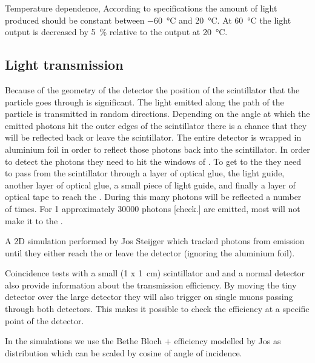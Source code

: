 Temperature dependence, According to specifications the amount of light
produced should be constant between \SI{-60}{\degreeCelsius} and
\SI{20}{\degreeCelsius}. At \SI{60}{\degreeCelsius} the light output is
decreased by \SI{5}{\percent} relative to the output at
\SI{20}{\degreeCelsius}.

\subsection{Light transmission}

Because of the geometry of the detector the position of the scintillator
that the particle goes through is significant. The light emitted along
the path of the particle is transmitted in random directions. Depending
on the angle at which the emitted photons hit the outer edges of the
scintillator there is a chance that they will be reflected back or leave
the scintillator. The entire detector is wrapped in aluminium foil in
order to reflect those photons back into the scintillator. In order to
detect the photons they need to hit the windows of \pmt. To get to the
\pmt they need to pass from the scintillator through a layer of optical
glue, the light guide, another layer of optical glue, a small piece of
light guide, and finally a layer of optical tape to reach the \pmt.
During this many photons will be reflected a number of times. For
\SI{1}{\mip} approximately 30000 photons [check.] are emitted, most will
not make it to the \pmt.

A 2D simulation performed by Jos Steijger which tracked photons from
emission until they either reach the \pmt or leave the detector
(ignoring the aluminium foil).

Coincidence tests with a small (\SI[product-units = repeat]{1 x
1}{\centi\meter}) scintillator and \pmt and a normal \hisparc detector
also provide information about the transmission efficiency. By moving
the tiny detector over the large detector they will also trigger on
single muons passing through both detectors. This makes it possible to
check the efficiency at a specific point of the detector.

In the simulations we use the Bethe Bloch + efficiency modelled by Jos
as distribution which can be scaled by cosine of angle of incidence.


